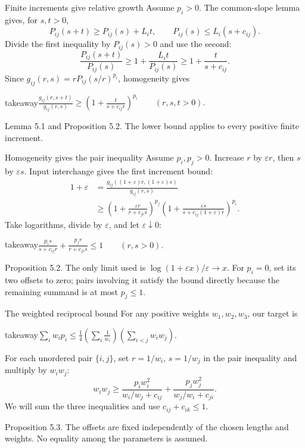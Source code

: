 \documentclass[aspectratio=169,11pt]{beamer}
\newcommand{\source}[1]{\vfill\par{\fontsize{7.5}{9}\selectfont\color{muted}#1\par}}
\newcommand{\takeaway}[1]{\begin{beamercolorbox}[sep=0.65em,wd=\linewidth]{takeaway}#1\end{beamercolorbox}}
\begin{document}
\begin{frame}{Finite increments give relative growth}
  Assume $p_i>0$. The common-slope lemma gives, for $s,t>0$,
  \[
    P_{ij}(s+t)\ge P_{ij}(s)+L_it,\qquad
    P_{ij}(s)\le L_i(s+c_{ij}).
  \]
  Divide the first inequality by $P_{ij}(s)>0$ and use the second:
  \[
    \frac{P_{ij}(s+t)}{P_{ij}(s)}
    \ge1+\frac{L_it}{P_{ij}(s)}
    \ge1+\frac{t}{s+c_{ij}}.
  \]
  Since $g_{ij}(r,s)=rP_{ij}(s/r)^{p_i}$, homogeneity gives
  \takeaway{$\displaystyle
    \frac{g_{ij}(r,s+t)}{g_{ij}(r,s)}
    \ge\left(1+\frac{t}{s+c_{ij}r}\right)^{p_i}
    \qquad(r,s,t>0).
  $}
  \source{Lemma 5.1 and Proposition 5.2.
  The lower bound applies to every positive finite increment.}
\end{frame}

\begin{frame}{Homogeneity gives the pair inequality}
  Assume $p_i,p_j>0$. Increase $r$ by $\varepsilon r$, then $s$ by
  $\varepsilon s$. Input interchange gives the first increment bound:
  \[
  \begin{aligned}
    1+\varepsilon
    &=\frac{g_{ij}((1+\varepsilon)r,(1+\varepsilon)s)}{g_{ij}(r,s)}\\
    &\ge
    \left(1+\frac{\varepsilon r}{r+c_{ji}s}\right)^{p_j}
    \left(1+\frac{\varepsilon s}{s+c_{ij}(1+\varepsilon)r}\right)^{p_i}.
  \end{aligned}
  \]
  Take logarithms, divide by $\varepsilon$, and let $\varepsilon\downarrow0$:
  \takeaway{$\displaystyle
    \frac{p_is}{s+c_{ij}r}+\frac{p_jr}{r+c_{ji}s}\le1
    \qquad(r,s>0).
  $}
  \source{Proposition 5.2. The only limit used is
  $\log(1+\varepsilon x)/\varepsilon\to x$.
  For $p_i=0$, set its two offsets to zero; pairs involving it satisfy the
  bound directly because the remaining summand is at most $p_j\le1$.}
\end{frame}

\begin{frame}{The weighted reciprocal bound}
  For any positive weights $w_1,w_2,w_3$, our target is
  \takeaway{$\displaystyle
    \sum_iw_ip_i\le
    \frac14\left(\sum_i\frac1{w_i}\right)
             \left(\sum_{i<j}w_iw_j\right).
  $}
  \medskip
  For each unordered pair $\{i,j\}$, set $r=1/w_i$, $s=1/w_j$
  in the pair inequality and multiply by $w_iw_j$:
  \[
    w_iw_j\ge
    \frac{p_iw_i^2}{w_i/w_j+c_{ij}}
    +\frac{p_jw_j^2}{w_j/w_i+c_{ji}}.
  \]
  We will sum the three inequalities and use $c_{ij}+c_{ik}\le1$.
  \source{Proposition 5.3. The offsets are fixed independently of the
  chosen lengths and weights. No equality among the parameters is assumed.}
\end{frame}
\end{document}
